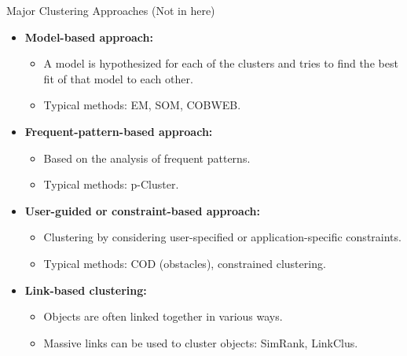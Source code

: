 \begin{frame}{Major Clustering Approaches (Not in here)}
	\begin{itemize}
		\item \textbf{Model-based approach:}
		      \begin{itemize}
			      \item A model is hypothesized for each of the clusters and tries to
			            find the best fit of that model to each other.
			      \item Typical methods: EM, SOM, COBWEB.
		      \end{itemize}
		\item \textbf{Frequent-pattern-based approach:}
		      \begin{itemize}
			      \item Based on the analysis of frequent patterns.
			      \item Typical methods: p-Cluster.
		      \end{itemize}
		\item \textbf{User-guided or constraint-based approach:}
		      \begin{itemize}
			      \item Clustering by considering user-specified or
			            application-specific constraints.
			      \item Typical methods: COD (obstacles), constrained clustering.
		      \end{itemize}
		\item \textbf{Link-based clustering:}
		      \begin{itemize}
			      \item Objects are often linked together in various ways.
			      \item Massive links can be used to cluster objects: SimRank,
			            LinkClus.
		      \end{itemize}
	\end{itemize}
\end{frame}
